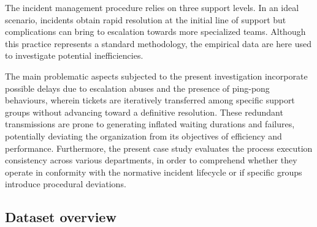 \documentclass[11pt,a4paper]{article}
\begin{document}
The incident management procedure relies on three support levels. In an ideal scenario, incidents obtain rapid resolution at the initial line of support but complications can bring to escalation towards more specialized teams. Although this practice represents a standard methodology, the empirical data are here used to investigate potential inefficiencies.

The main problematic aspects subjected to the present investigation incorporate possible delays due to escalation abuses and the presence of ping-pong behaviours, wherein tickets are iteratively transferred among specific support groups without advancing toward a definitive resolution. These redundant transmissions are prone to generating inflated waiting durations and failures, potentially deviating the organization from its objectives of efficiency and performance. Furthermore, the present case study evaluates the process execution consistency across various departments, in order to comprehend whether they operate in conformity with the normative incident lifecycle or if specific groups introduce procedural deviations.

\subsection{Dataset overview}
\end{document}
